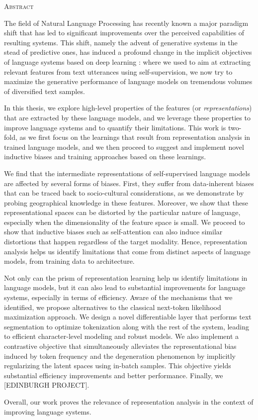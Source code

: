 \begin{center}
  \textsc{Abstract}
\end{center}
%
\noindent
%

The field of Natural Language Processing has recently known a major paradigm shift that has led to significant improvements over the perceived capabilities of resulting systems. This shift, namely the advent of generative systems in the stead of predictive ones, has induced a profound change in the implicit objectives of language systems based on deep learning : where we used to aim at extracting relevant features from text utterances using self-supervision, we now try to maximize the generative performance of language models on tremendous volumes of diversified text samples.

In this thesis, we explore high-level properties of the features (or \textit{representations}) that are extracted by these language models, and we leverage these properties to improve language systems and to quantify their limitations. This work is two-fold, as we first focus on the learnings that result from representation analysis in trained language models, and we then proceed to suggest and implement novel inductive biases and training approaches based on these learnings.

We find that the intermediate representations of self-supervised language models are affected by several forms of biases. First, they suffer from data-inherent biases that can be traced back to socio-cultural considerations, as we demonstrate by probing geographical knowledge in these features. Moreover, we show that these representational spaces can be distorted by the particular nature of language, especially when the dimensionality of the feature space is small. We proceed to show that inductive biases such as self-attention can also induce similar distortions that happen regardless of the target modality. Hence, representation analysis helps us identify limitations that come from distinct aspects of language models, from training data to architecture.

Not only can the prism of representation learning help us identify limitations in language models, but it can also lead to substantial improvements for language systems, especially in terms of efficiency. Aware of the mechanisms that we identified, we propose alternatives to the classical next-token likelihood maximization approach. We design a novel differentiable layer that performs text segmentation to optimize tokenization along with the rest of the system, leading to efficient character-level modeling and robust models. We also implement a contrastive objective that simultaneously alleviates the representational bias induced by token frequency and the degeneration phenomenon by implicitly regularizing the latent spaces using in-batch samples. This objective yields substantial efficiency improvements and better performance. Finally, we [EDINBURGH PROJECT].

Overall, our work proves the relevance of representation analysis in the context of improving language systems.
